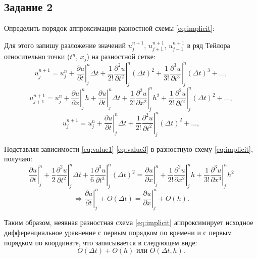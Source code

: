 \documentclass[12pt, a4paper]{report}
\begin{document}
	\subsection*{Задание 2}
	\large
	Определить порядок аппроксимации разностной схемы \eqref{eq:implicit}: \par
	Для этого запишу разложение значений $u_{j}^{n+1}$, $u_{j+1}^{n+1}$, $u_{j-1}^{n+1}$ в ряд Тейлора относительно точки ($t^{n}$, $x_{j}$) на разностной сетке:
	\begin{equation}\label{eq:value1}
	u_{j}^{n+1} = u_{j}^{n} + \left.\frac{\partial u}{\partial t}\right|_{j}^{n}\Delta t + \left.\frac{1}{2!}\frac{\partial^{2} u}{\partial t^{2}}\right|_{j}^{n}(\Delta t)^{2} + \left.\frac{1}{3!}\frac{\partial^{3} u}{\partial t^{3}}\right|_{j}^{n}(\Delta t)^{3} + \dots,
	\end{equation}
	\begin{equation}\label{eq:value2}
		u_{j+1}^{n+1} = u_{j}^{n} + \left.\frac{\partial u}{\partial x}\right|_{j}^{n}h + \left.\frac{\partial u}{\partial t}\right|_{j}^{n}\Delta t + \left.\frac{1}{2!}\frac{\partial^{2} u}{\partial x^{2}}\right|_{j}^{n}h^{2} + \left.\frac{1}{2!}\frac{\partial^{2} u}{\partial t^{2}}\right|_{j}^{n}(\Delta t)^{2} + \dots,
	\end{equation}
	\begin{equation}\label{eq:value3}
		u_{j}^{n+1} = u_{j}^{n} + \left.\frac{\partial u}{\partial t}\right|_{j}^{n}\Delta t + \left.\frac{1}{2!}\frac{\partial^{2} u}{\partial t^{2}}\right|_{j}^{n}(\Delta t)^{2} + \dots,
	\end{equation}
	\par
	Подставляя зависимости \eqref{eq:value1}-\eqref{eq:value3} в разностную схему \eqref{eq:implicit}, получаю:
	\begin{equation*}
		\left.\frac{\partial u}{\partial t}\right|_{j}^{n} + \left.\frac{1}{2}\frac{\partial^{2} u}{\partial t^{2}}\right|_{j}^{n}\Delta t + \left.\frac{1}{6}\frac{\partial^{3} u}{\partial t^{3}}\right|_{j}^{n}(\Delta t)^{2} = \left.\frac{\partial u}{\partial x}\right|_{j}^{n} + \left.\frac{1}{2!}\frac{\partial^{2} u}{\partial x^{2}}\right|_{j}^{n}h + \left.\frac{1}{3!}\frac{\partial^{3} u}{\partial x^{3}}\right|_{j}^{n}h^{2}
	\end{equation*}
	\begin{equation*}
		\Rightarrow \left.\frac{\partial u}{\partial t}\right|_{j}^{n} + O(\Delta t) = \left.\frac{\partial u}{\partial x}\right|_{j}^{n} + O(h).
	\end{equation*}
	\par
	Таким образом, неявная разностная схема \eqref{eq:implicit} аппроксимирует исходное дифференциальное уравнение с первым порядком по времени и с первым порядком по координате, что записывается в следующем виде:
	\begin{equation*}
		O(\Delta t) + O(h) \text{ или } O(\Delta t, h).
	\end{equation*}
\end{document}

